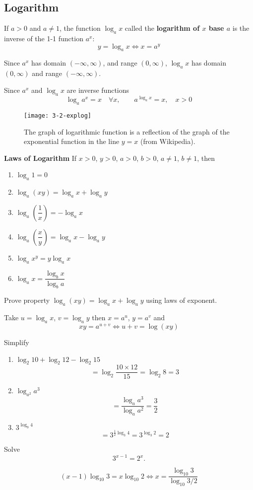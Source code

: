 \documentclass[../main.tex]{subfiles}
\begin{document}
\subsection*{Logarithm}

If $a >0$ and $a \neq 1$, the function $\log_a x$ called the \textbf{logarithm of $x$ base $a$} is the inverse of the 1-1 function $a^x$:
\[
    y = \log_a x \iff x = a^y
\]

Since $a^x$ has domain $(-\infty, \infty)$, and range $(0, \infty)$, $\log_a x$ has domain $(0, \infty)$ and range $(-\infty, \infty)$.

Since $a^x$ and $\log_a x$ are inverse functions
\[
    \log_a a^x = x \quad \forall x, \qquad a^{\log_a x} = x, \quad x>0
\]

\begin{figure}[H]
    \centering
    \texttt{[image: 3-2-explog]}
    \caption{The graph of logarithmic function is a reflection of the graph of the exponential function in the line $y = x$ (from Wikipedia).}
\end{figure}

\textbf{Laws of Logarithm}
If $x>0$, $y>0$, $a>0$, $b>0$, $a \neq 1$, $b \neq 1$, then

\begin{multicols}{2}
\begin{enumerate}
    \item $\log_a 1 = 0$
    \item $\log_a (x y) = \log_a x + \log_a y$
    \item $\log_a (\dfrac{1}{x}) = - \log_a x$
    \item $\log_a (\dfrac{x}{y}) = \log_a x - \log_a y$
    \item $\log_a x^y = y \log_a x$
    \item $\log_a x = \dfrac{\log_b x}{\log_b a}$
\end{enumerate}
\end{multicols}

\begin{example}
    Prove property $\log_a (x y) = \log_a x + \log_a y$ using laws of exponent.
\end{example}
\begin{solution}
    Take $u = \log_a x$, $v = \log_a y$ then $x = a^u$, $y = a^v$ and
    \[
        x y = a^{u+v} \iff u + v = \log(xy)
    \]
\end{solution}

\begin{example}
    Simplify
    \begin{enumerate}
        \item $\log_2 10 + \log_2 12 - \log_2 15$
        \[
            = \log_2 \frac{10 \times 12}{15} = \log_2 8 = 3
        \]
        \item $\log_{a^2} a^3$
        \[
             = \frac{\log_a a^3}{\log_a a^2} = \frac{3}{2}
        \]
        \item $3^{\log_9 4}$
        \[
             = 3^{\frac{1}{2} \log_3 4} = 3^{\log_3 2} = 2
        \]
    \end{enumerate}
\end{example}

\begin{example}
    Solve
    \[
        3^{x-1} = 2^x.
    \]
\end{example}
\begin{solution}
    \[
        (x-1) \log_{10} 3 = x \log_{10} 2 \iff
        x = \frac{\log_{10} 3}{\log_{10} 3/2}
    \]
\end{solution}
\end{document}
